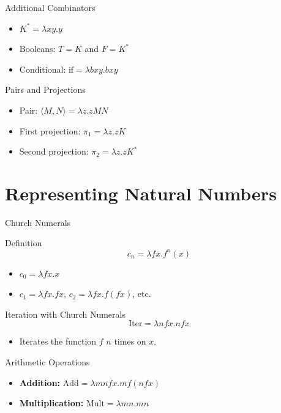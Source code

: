 \documentclass{beamer}
\begin{document}
\begin{frame}{Additional Combinators}
  \begin{itemize}
    \item \( K^* = \lambda xy.y \)
    \item Booleans: \(T = K\) and \(F = K^*\)
    \item Conditional: \(\text{if} = \lambda bxy. bxy\)
  \end{itemize}
\end{frame}

\begin{frame}{Pairs and Projections}
  \begin{itemize}
    \item Pair: \(\langle M, N \rangle = \lambda z. zMN\)
    \item First projection: \(\pi_1 = \lambda z. zK\)
    \item Second projection: \(\pi_2 = \lambda z. zK^*\)
  \end{itemize}
\end{frame}

\section{Representing Natural Numbers}
\begin{frame}{Church Numerals}
  \begin{block}{Definition}
    \[
    c_n = \lambda f x. f^n(x)
    \]
    \begin{itemize}
      \item \(c_0 = \lambda f x. x\)
      \item \(c_1 = \lambda f x. f x\), \(c_2 = \lambda f x. f (f x)\), etc.
    \end{itemize}
  \end{block}
\end{frame}

\begin{frame}{Iteration with Church Numerals}
  \[
    \text{Iter} = \lambda nfx. n f x
  \]
  \begin{itemize}
    \item Iterates the function \(f\) \(n\) times on \(x\).
  \end{itemize}
\end{frame}

\begin{frame}{Arithmetic Operations}
  \begin{itemize}
    \item \textbf{Addition:} \( \text{Add} = \lambda m n f x. m f (n f x) \)
    \item \textbf{Multiplication:} \( \text{Mult} = \lambda m n. m n \)
  \end{itemize}
\end{frame}
\end{document}
